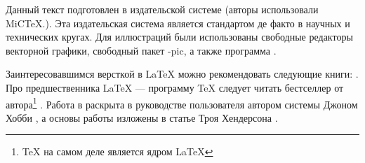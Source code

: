 \documentclass[a4paper,oneside,14pt]{scrbook}
\begin{document}
    Данный текст подготовлен в издательской системе {\LaTeXe} (авторы использовали MiC\TeX.). Эта издательская система является стандартом де факто в научных и технических кругах. Для иллюстраций были использованы свободные редакторы векторной графики, свободный пакет \Xy-pic, а также программа \MP.

    Заинтересовавшимся версткой в {\LaTeX} можно рекомендовать следующие книги: \cite{bib:cotelnikov,bib:baldin,bib:lvovsky}. 
    Про предшественника {\LaTeX} --- программу {\TeX} следует читать бестселлер от автора\footnote{{\TeX} на самом деле является ядром \LaTeX} \cite{bib:knuth:AllAbout}. Работа в {\MP} раскрыта в руководстве пользователя автором системы Джоном Хобби \cite{bib:hobby:metapostman}, а основы работы изложены в статье Троя Хендерсона \cite{bib:henderson:metapostguide}.
    
    
    
\end{document}
